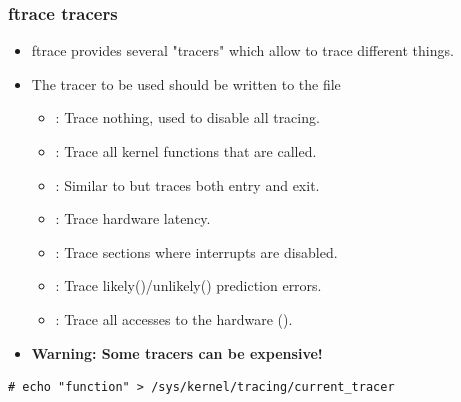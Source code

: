 \begin{frame}[fragile]
  \frametitle{ftrace tracers}
  \begin{itemize}
    \item ftrace provides several "tracers" which allow to trace different things.
    \item The tracer to be used should be written to the  file
    \begin{itemize}
      \item {}: Trace nothing, used to disable all tracing.
      \item {}: Trace all kernel functions that are called.
      \item {}: Similar to  but traces both entry and exit.
      \item {}: Trace hardware latency.
      \item {}: Trace sections where interrupts are disabled.
      \item {}: Trace likely()/unlikely() prediction errors.
      \item {}: Trace all accesses to the hardware ().
    \end{itemize}
    \item \textbf{Warning: Some tracers can be expensive!}
  \end{itemize}
  \begin{block}{}
    \begin{verbatim}
# echo "function" > /sys/kernel/tracing/current_tracer
    \end{verbatim}
  \end{block}
\end{frame}


